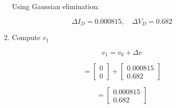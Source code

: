 \documentclass[12pt]{article}
\begin{document}
\begin{enumerate}
\begin{enumerate}
\begin{enumerate}
        Using Gaussian elimination:

        \[
        \Delta I_D = 0.000815, \quad \Delta V_D = 0.682
            \]

        \item Compute \( v_1 \)

        \[
        v_1 = v_0 + \Delta v
        \]

        \[
        =
        \begin{bmatrix}
        0 \\
        0
        \end{bmatrix}
        +
        \begin{bmatrix}
        0.000815 \\
        0.682
        \end{bmatrix}
        \]

        \[
        =
        \begin{bmatrix}
        0.000815 \\
        0.682
        \end{bmatrix}
        \]

    \end{enumerate}

\end{enumerate}
\end{enumerate}
\end{document}
